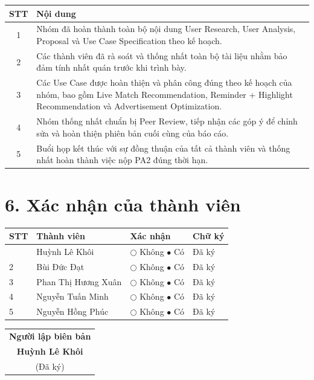 \documentclass[11pt,a4paper]{article}
\begin{document}
\begin{tabularx}{\textwidth}{|c|X|}
\hline
\rowcolor{gray!20}
\textbf{STT} &
\textbf{Nội dung}\\
\hline

1 &
Nhóm đã hoàn thành toàn bộ nội dung User Research, User Analysis, Proposal và Use Case Specification theo kế hoạch.\\
\hline

2 &
Các thành viên đã rà soát và thống nhất toàn bộ tài liệu nhằm bảo đảm tính nhất quán trước khi trình bày.\\
\hline

3 &
Các Use Case được hoàn thiện và phân công đúng theo kế hoạch của nhóm, bao gồm Live Match Recommendation, Reminder + Highlight Recommendation và Advertisement Optimization.\\
\hline

4 &
Nhóm thống nhất chuẩn bị Peer Review, tiếp nhận các góp ý để chỉnh sửa và hoàn thiện phiên bản cuối cùng của báo cáo.\\
\hline

5 &
Buổi họp kết thúc với sự đồng thuận của tất cả thành viên và thống nhất hoàn thành việc nộp PA2 đúng thời hạn.\\
\hline

\end{tabularx}


\section*{6. Xác nhận của thành viên}

\begin{tabularx}{\textwidth}{|>{\centering\arraybackslash}p{0.8cm}|X|>{\centering\arraybackslash}p{3.8cm}|>{\centering\arraybackslash}p{2.5cm}|}
\hline
\rowcolor{gray!20}
\textbf{STT} &
\centering\textbf{Thành viên} &
\textbf{Xác nhận} &
\textbf{Chữ ký}\\
\hline

1 &
Huỳnh Lê Khôi &
$\bigcirc$ Không \qquad $\bullet$ Có &
Đã ký\\
\hline

2 &
Bùi Đức Đạt &
$\bigcirc$ Không \qquad $\bullet$ Có &
Đã ký\\
\hline

3 &
Phan Thị Hương Xuân &
$\bigcirc$ Không \qquad $\bullet$ Có &
Đã ký\\
\hline

4 &
Nguyễn Tuấn Minh &
$\bigcirc$ Không \qquad $\bullet$ Có &
Đã ký\\
\hline

5 &
Nguyễn Hồng Phúc &
$\bigcirc$ Không \qquad $\bullet$ Có &
Đã ký\\
\hline

\end{tabularx}

\vspace{1.5cm}

\begin{flushright}
\begin{tabular}{c}
\textbf{Người lập biên bản}\\[2cm]
\textbf{Huỳnh Lê Khôi}\\
(Đã ký)
\end{tabular}
\end{flushright}
\end{document}
